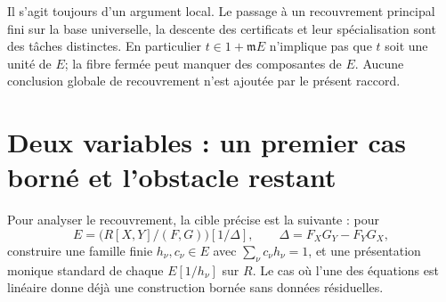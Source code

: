 \documentclass[11pt]{amsart}
\newcommand{\m}{\mathfrak m}
\begin{document}
Il s'agit toujours d'un argument local. Le passage à un recouvrement
principal fini sur la base universelle, la descente des certificats et
leur spécialisation sont des tâches distinctes. En particulier
$t\in1+\m E$ n'implique pas que $t$ soit une unité de $E$; la fibre
fermée peut manquer des composantes de $E$. Aucune conclusion globale
de recouvrement n'est ajoutée par le présent raccord.

\section{Deux variables : un premier cas borné et l'obstacle restant}

Pour analyser le recouvrement, la cible précise est la suivante : pour
\[
 E=\bigl(R[X,Y]/(F,G)\bigr)[1/\Delta],\qquad
 \Delta=F_XG_Y-F_YG_X,
\]
construire une famille finie $h_\nu,c_\nu\in E$ avec
$\sum_\nu c_\nu h_\nu=1$, et une présentation monique standard de
chaque $E[1/h_\nu]$ sur $R$. Le cas où l'une des équations est linéaire
donne déjà une construction bornée sans données résiduelles.
\end{document}

